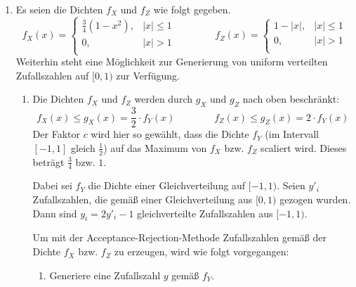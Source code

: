 \documentclass[a4paper]{scrartcl}
\def \blattnr {12}
\begin{document}
\begin{enumerate}[label=\bfseries \blattnr.\arabic*]
    \item %
        Es seien die Dichten $f_X$ und $f_Z$ wie folgt gegeben.
        \begin{equation*}
            f_X(x) =
            \begin{cases}
                \frac{3}{4} (1-x^2), & |x| \leq 1 \\
                0,                   & |x| > 1    \\
            \end{cases}
            \qquad\qquad
            f_Z(x) =
            \begin{cases}
                1 - |x|, & |x| \leq 1 \\
                0,       & |x| > 1    \\
            \end{cases}
        \end{equation*}
        Weiterhin steht eine Möglichkeit zur Generierung von uniform verteilten
        Zufallszahlen auf $[0,1)$ zur Verfügung.
        \begin{enumerate}
            \item
                Die Dichten $f_X$ und $f_Z$ werden durch $g_X$ und $g_Z$ nach
                oben beschränkt:
                \begin{equation*}
                    f_X(x)
                    \leq g_X(x)
                    = \frac{3}{2} \cdot f_Y(x)
                    \qquad\qquad
                    f_Z(x)
                    \leq g_Z(x)
                    = 2 \cdot f_Y(x)
                \end{equation*}
                Der Faktor $c$ wird hier so gewählt, dass die Dichte $f_Y$ (im
                Intervall $[-1,1]$ gleich $\frac{1}{2}$) auf das Maximum von
                $f_X$ bzw. $f_Z$ scaliert wird. Dieses beträgt $\frac{3}{4}$
                bzw. $1$.

                Dabei sei $f_Y$ die Dichte einer Gleichverteilung auf $[-1,1)$.
                Seien $y'_i$ Zufallszahlen, die gemäß einer Gleichverteilung
                aus $[0,1)$ gezogen wurden. Dann sind $y_i = 2y'_i - 1$
                gleichverteilte Zufallszahlen aus $[-1,1)$.

                Um mit der Acceptance-Rejection-Methode Zufallszahlen gemäß der
                Dichte $f_X$ bzw. $f_Z$ zu erzeugen, wird wie folgt vorgegangen:
                \begin{enumerate}
                    \item
                        Generiere eine Zufallszahl $y$ gemäß $f_Y$.


\end{enumerate}
\end{enumerate}
\end{enumerate}
\end{document}
